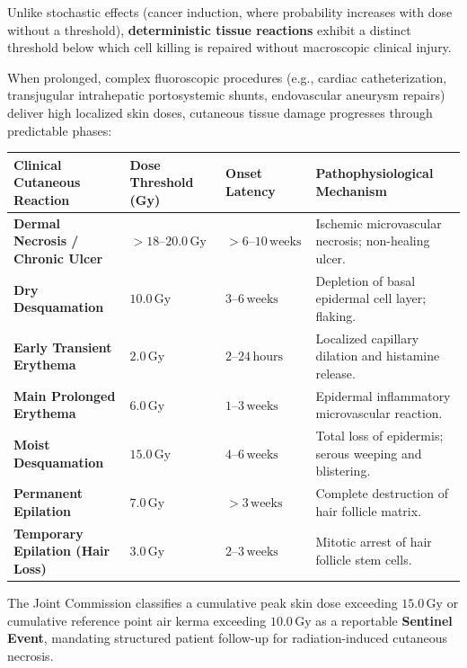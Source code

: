 \documentclass[11pt,a4paper]{article}
\begin{document}
Unlike stochastic effects (cancer induction, where probability increases with dose without a threshold), \textbf{deterministic tissue reactions} exhibit a distinct threshold below which cell killing is repaired without macroscopic clinical injury.

\begin{radiationsafety}
When prolonged, complex fluoroscopic procedures (e.g., cardiac catheterization, transjugular intrahepatic portosystemic shunts, endovascular aneurysm repairs) deliver high localized skin doses, cutaneous tissue damage progresses through predictable phases:

\begin{center}
\setlength{\tabcolsep}{4pt}
\begin{tabular}{p{3.6cm}p{2.3cm}p{2.4cm}p{5.8cm}}
\toprule
\textbf{Clinical Cutaneous Reaction} & \textbf{Dose Threshold (Gy)} & \textbf{Onset Latency} & \textbf{Pathophysiological Mechanism} \\
\midrule
\textbf{Dermal Necrosis / Chronic Ulcer} & $> 18\text{--}20.0\,\text{Gy}$ & $> 6\text{--}10\,\text{weeks}$ & Ischemic microvascular necrosis; non-healing ulcer. \\
\textbf{Dry Desquamation} & $10.0\,\text{Gy}$ & $3\text{--}6\,\text{weeks}$ & Depletion of basal epidermal cell layer; flaking. \\
\textbf{Early Transient Erythema} & $2.0\,\text{Gy}$ & $2\text{--}24\,\text{hours}$ & Localized capillary dilation and histamine release. \\
\textbf{Main Prolonged Erythema} & $6.0\,\text{Gy}$ & $1\text{--}3\,\text{weeks}$ & Epidermal inflammatory microvascular reaction. \\
\textbf{Moist Desquamation} & $15.0\,\text{Gy}$ & $4\text{--}6\,\text{weeks}$ & Total loss of epidermis; serous weeping and blistering. \\
\textbf{Permanent Epilation} & $7.0\,\text{Gy}$ & $> 3\,\text{weeks}$ & Complete destruction of hair follicle matrix. \\
\textbf{Temporary Epilation (Hair Loss)} & $3.0\,\text{Gy}$ & $2\text{--}3\,\text{weeks}$ & Mitotic arrest of hair follicle stem cells. \\
\bottomrule
\end{tabular}
\label{tab:radiation_injuries}
\end{center}

The Joint Commission classifies a cumulative peak skin dose exceeding \textbf{$15.0\,\text{Gy}$} or cumulative reference point air kerma exceeding \textbf{$10.0\,\text{Gy}$} as a reportable \textbf{Sentinel Event}, mandating structured patient follow-up for radiation-induced cutaneous necrosis.
\end{radiationsafety}
\end{document}
